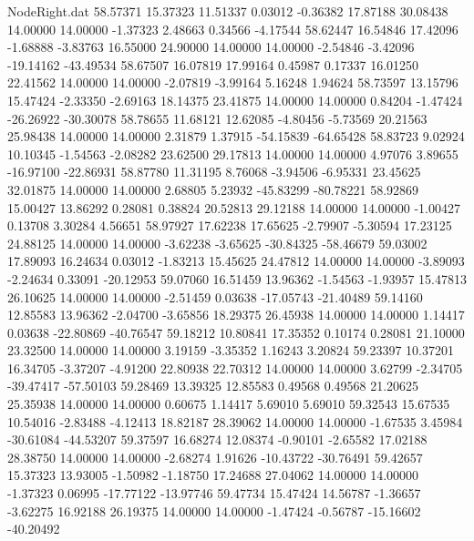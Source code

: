 \begin{filecontents}{NodeRight.dat}
  58.57371   15.37323   11.51337     0.03012   -0.36382   17.87188   30.08438   14.00000   14.00000   -1.37323    2.48663    0.34566   -4.17544
  58.62447   16.54846   17.42096    -1.68888   -3.83763   16.55000   24.90000   14.00000   14.00000   -2.54846   -3.42096  -19.14162  -43.49534
  58.67507   16.07819   17.99164     0.45987    0.17337   16.01250   22.41562   14.00000   14.00000   -2.07819   -3.99164    5.16248    1.94624
  58.73597   13.15796   15.47424    -2.33350   -2.69163   18.14375   23.41875   14.00000   14.00000    0.84204   -1.47424  -26.26922  -30.30078
  58.78655   11.68121   12.62085    -4.80456   -5.73569   20.21563   25.98438   14.00000   14.00000    2.31879    1.37915  -54.15839  -64.65428
  58.83723    9.02924   10.10345    -1.54563   -2.08282   23.62500   29.17813   14.00000   14.00000    4.97076    3.89655  -16.97100  -22.86931
  58.87780   11.31195    8.76068    -3.94506   -6.95331   23.45625   32.01875   14.00000   14.00000    2.68805    5.23932  -45.83299  -80.78221
  58.92869   15.00427   13.86292     0.28081    0.38824   20.52813   29.12188   14.00000   14.00000   -1.00427    0.13708    3.30284    4.56651
  58.97927   17.62238   17.65625    -2.79907   -5.30594   17.23125   24.88125   14.00000   14.00000   -3.62238   -3.65625  -30.84325  -58.46679
  59.03002   17.89093   16.24634     0.03012   -1.83213   15.45625   24.47812   14.00000   14.00000   -3.89093   -2.24634    0.33091  -20.12953
  59.07060   16.51459   13.96362    -1.54563   -1.93957   15.47813   26.10625   14.00000   14.00000   -2.51459    0.03638  -17.05743  -21.40489
  59.14160   12.85583   13.96362    -2.04700   -3.65856   18.29375   26.45938   14.00000   14.00000    1.14417    0.03638  -22.80869  -40.76547
  59.18212   10.80841   17.35352     0.10174    0.28081   21.10000   23.32500   14.00000   14.00000    3.19159   -3.35352    1.16243    3.20824
  59.23397   10.37201   16.34705    -3.37207   -4.91200   22.80938   22.70312   14.00000   14.00000    3.62799   -2.34705  -39.47417  -57.50103
  59.28469   13.39325   12.85583     0.49568    0.49568   21.20625   25.35938   14.00000   14.00000    0.60675    1.14417    5.69010    5.69010
  59.32543   15.67535   10.54016    -2.83488   -4.12413   18.82187   28.39062   14.00000   14.00000   -1.67535    3.45984  -30.61084  -44.53207
  59.37597   16.68274   12.08374    -0.90101   -2.65582   17.02188   28.38750   14.00000   14.00000   -2.68274    1.91626  -10.43722  -30.76491
  59.42657   15.37323   13.93005    -1.50982   -1.18750   17.24688   27.04062   14.00000   14.00000   -1.37323    0.06995  -17.77122  -13.97746
  59.47734   15.47424   14.56787    -1.36657   -3.62275   16.92188   26.19375   14.00000   14.00000   -1.47424   -0.56787  -15.16602  -40.20492

\end{filecontents}
